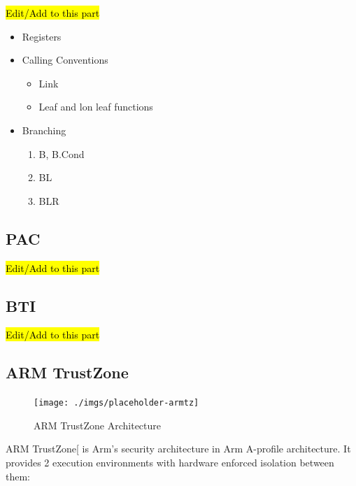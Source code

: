 \documentclass[a4paper, nobind]{templates/ociamthesis}
\providecommand{\tightlist}{%
  \setlength{\itemsep}{0pt}\setlength{\parskip}{0pt}}
\begin{document}
\hl{Edit/Add to this part}

\begin{itemize}
\tightlist
\item
  Registers
\item
  Calling Conventions

  \begin{itemize}
  \tightlist
  \item
    Link
  \item
    Leaf and lon leaf functions
  \end{itemize}
\item
  Branching

  \begin{enumerate}
  \def\labelenumi{\arabic{enumi}.}
  \tightlist
  \item
    B, B.Cond
  \item
    BL
  \item
    BLR
  \end{enumerate}
\end{itemize}

\subsection{PAC}\label{pac}

\hl{Edit/Add to this part}

\subsection{BTI}\label{bti}

\hl{Edit/Add to this part}

\subsection{ARM TrustZone}\label{arm-trustzone}

\begin{figure}[H]

{\centering \texttt{[image: ./imgs/placeholder-armtz]} 

}

\caption{ARM TrustZone Architecture}\label{fig:armtz-arch}
\end{figure}

ARM TrustZone{[}\citeproc{ref-armtz}{3}{]} is Arm's security architecture in Arm A-profile architecture.
It provides 2 execution environments with hardware enforced isolation between them:
\end{document}
